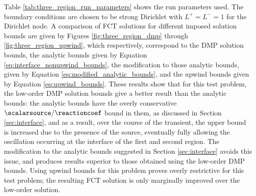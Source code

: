 \begin{table}[htb]
\end{table}

Table \ref{tab:three_region_run_parameters} shows the run parameters used.
The boundary conditions are chosen to be strong Dirichlet with $L^+=L^-=1$
for the Dirichlet node. A comparison of FCT solutions for different imposed
solution bounds are given by Figures \ref{fig:three_region_dmp} through
\ref{fig:three_region_upwind}, which respectively, correspond to the
DMP solution bounds, the analytic bounds given by Equation
\eqref{eq:interface_nonupwind_bounds},
the modification to those analytic bounds, given by Equation
\eqref{eq:modified_analytic_bounds}, and the upwind bounds given by Equation
\eqref{eq:upwind_bounds}. These results show that for this test problem,
the low-order DMP solution bounds
give a better result than the analytic bounds: the analytic bounds have the
overly conservative $\scalarsource/\reactioncoef$ bound in them, as discussed
in Section \ref{sec:interface}, and as a result, over the course of the transient,
the upper bound is increased due to the presence of the source, eventually fully
allowing the oscillation occurring at the interface of the first and second
region. The modification to the analytic bounds suggested in Section
\ref{sec:interface} avoids this issue, and produces results superior to those
obtained using the low-order DMP bounds. Using upwind bounds for this problem
proves overly restrictive for this test problem; the resulting FCT solution
is only marginally improved over the low-order solution.

